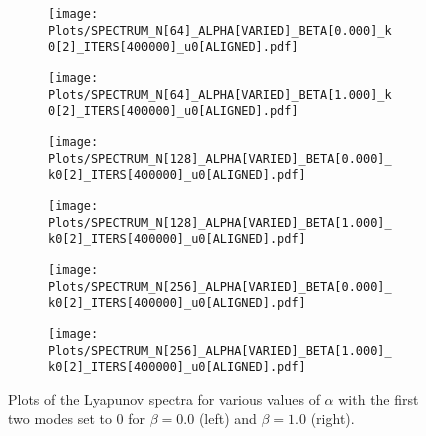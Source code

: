 \documentclass[9pt]{article}
\begin{document}
\begin{figure}[h!]
  \centering
  \begin{subfigure}[b]{0.49\linewidth}
    \texttt{[image: Plots/SPECTRUM\_N[64]\_ALPHA[VARIED]\_BETA[0.000]\_k0[2]\_ITERS[400000]\_u0[ALIGNED].pdf]}
    \caption{}
  \end{subfigure}
  \begin{subfigure}[b]{0.49\linewidth}
    \texttt{[image: Plots/SPECTRUM\_N[64]\_ALPHA[VARIED]\_BETA[1.000]\_k0[2]\_ITERS[400000]\_u0[ALIGNED].pdf]}
    \caption{}
  \end{subfigure}
  \begin{subfigure}[b]{0.49\linewidth}
    \texttt{[image: Plots/SPECTRUM\_N[128]\_ALPHA[VARIED]\_BETA[0.000]\_k0[2]\_ITERS[400000]\_u0[ALIGNED].pdf]}
    \caption{}
  \end{subfigure}
  \begin{subfigure}[b]{0.49\linewidth}
    \texttt{[image: Plots/SPECTRUM\_N[128]\_ALPHA[VARIED]\_BETA[1.000]\_k0[2]\_ITERS[400000]\_u0[ALIGNED].pdf]}
    \caption{}
  \end{subfigure}
  \begin{subfigure}[b]{0.49\linewidth}
    \texttt{[image: Plots/SPECTRUM\_N[256]\_ALPHA[VARIED]\_BETA[0.000]\_k0[2]\_ITERS[400000]\_u0[ALIGNED].pdf]}
    \caption{}
  \end{subfigure}
  \begin{subfigure}[b]{0.49\linewidth}
    \texttt{[image: Plots/SPECTRUM\_N[256]\_ALPHA[VARIED]\_BETA[1.000]\_k0[2]\_ITERS[400000]\_u0[ALIGNED].pdf]}
    \caption{}
  \end{subfigure}
  \caption{Plots of the Lyapunov spectra for various values of $\alpha$ with the first two modes set to 0 for $\beta = 0.0$ (left) and $\beta = 1.0$ (right).}
  \label{fig:4}
\end{figure}
\end{document}
